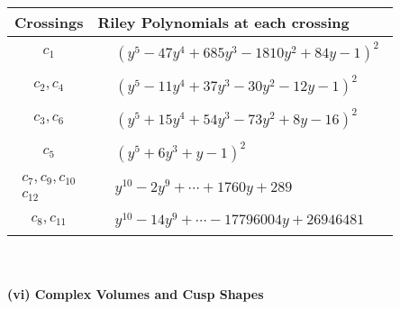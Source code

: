 \documentclass[1p]{elsarticle_modified}
\theoremstyle{definition}
\begin{document}
\begin{tabular}{m{50pt}|m{274pt}}
Crossings & \hspace{64pt}Riley Polynomials at each crossing \\
\hline $$\begin{aligned}c_{1}\end{aligned}$$&$\begin{aligned}
&(y^5-47 y^4+685 y^3-1810 y^2+84 y-1)^2
\end{aligned}$\\
\hline $$\begin{aligned}c_{2},c_{4}\end{aligned}$$&$\begin{aligned}
&(y^5-11 y^4+37 y^3-30 y^2-12 y-1)^2
\end{aligned}$\\
\hline $$\begin{aligned}c_{3},c_{6}\end{aligned}$$&$\begin{aligned}
&(y^5+15 y^4+54 y^3-73 y^2+8 y-16)^2
\end{aligned}$\\
\hline $$\begin{aligned}c_{5}\end{aligned}$$&$\begin{aligned}
&(y^5+6 y^3+y-1)^2
\end{aligned}$\\
\hline $$\begin{aligned}c_{7},c_{9},c_{10}\\c_{12}\end{aligned}$$&$\begin{aligned}
&y^{10}-2 y^9+\cdots+1760 y+289
\end{aligned}$\\
\hline $$\begin{aligned}c_{8},c_{11}\end{aligned}$$&$\begin{aligned}
&y^{10}-14 y^9+\cdots-17796004 y+26946481
\end{aligned}$\\
\hline
\end{tabular}\\~\\
\newpage\flushleft \textbf{(vi) Complex Volumes and Cusp Shapes}
\end{document}
